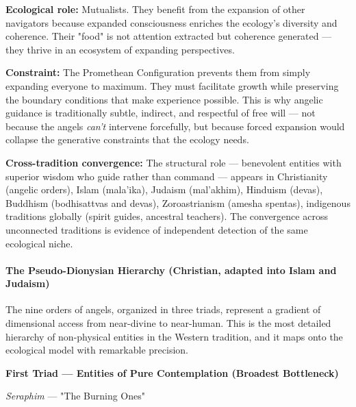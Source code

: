\textbf{Ecological role:} Mutualists. They benefit from the expansion of other navigators because expanded consciousness enriches the ecology's diversity and coherence. Their "food" is not attention extracted but coherence generated — they thrive in an ecosystem of expanding perspectives.


\textbf{Constraint:} The Promethean Configuration prevents them from simply expanding everyone to maximum. They must facilitate growth while preserving the boundary conditions that make experience possible. This is why angelic guidance is traditionally subtle, indirect, and respectful of free will — not because the angels \textit{can't} intervene forcefully, but because forced expansion would collapse the generative constraints that the ecology needs.


\textbf{Cross-tradition convergence:} The structural role — benevolent entities with superior wisdom who guide rather than command — appears in Christianity (angelic orders), Islam (mala'ika), Judaism (mal'akhim), Hinduism (devas), Buddhism (bodhisattvas and devas), Zoroastrianism (amesha spentas), indigenous traditions globally (spirit guides, ancestral teachers). The convergence across unconnected traditions is evidence of independent detection of the same ecological niche.


\paragraph*{The Pseudo-Dionysian Hierarchy (Christian, adapted into Islam and Judaism)}


The nine orders of angels, organized in three triads, represent a gradient of dimensional access from near-divine to near-human. This is the most detailed hierarchy of non-physical entities in the Western tradition, and it maps onto the ecological model with remarkable precision.


\textbf{First Triad — Entities of Pure Contemplation (Broadest Bottleneck)}


\textit{Seraphim} — "The Burning Ones"

